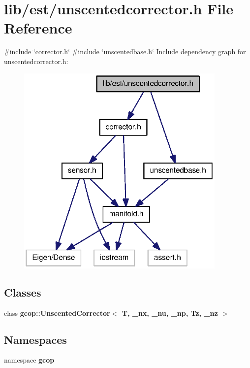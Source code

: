 \section{lib/est/unscentedcorrector.h \-File \-Reference}
\label{unscentedcorrector_8h}
{\ttfamily \#include \char`\"{}corrector.\-h\char`\"{}}\*
{\ttfamily \#include \char`\"{}unscentedbase.\-h\char`\"{}}\*
\-Include dependency graph for unscentedcorrector.\-h\-:
\nopagebreak
\begin{figure}[H]
\begin{center}
\leavevmode
\includegraphics[width=291pt]{unscentedcorrector_8h__incl}
\end{center}
\end{figure}
\subsection*{\-Classes}
\begin{DoxyCompactItemize}
\item 
class {\bf gcop\-::\-Unscented\-Corrector$<$ T, \-\_\-nx, \-\_\-nu, \-\_\-np, Tz, \-\_\-nz $>$}
\end{DoxyCompactItemize}
\subsection*{\-Namespaces}
\begin{DoxyCompactItemize}
\item 
namespace {\bf gcop}
\end{DoxyCompactItemize}
